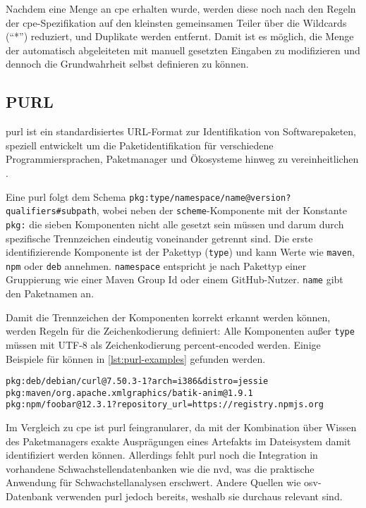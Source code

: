 Nachdem eine Menge an \acrshort{cpe} erhalten wurde, werden diese noch nach den Regeln der \acrshort{cpe}-Spezifikation auf den kleinsten gemeinsamen Teiler über die Wildcards (\enquote{*}) reduziert, und Duplikate werden entfernt.
Damit ist es möglich, die Menge der automatisch abgeleiteten  mit manuell gesetzten Eingaben zu modifizieren und dennoch die Grundwahrheit selbst definieren zu können.

\subsection{PURL}

\acrshort{purl} ist ein standardisiertes URL-Format zur Identifikation von Softwarepaketen, speziell entwickelt um die Paketidentifikation für verschiedene Programmiersprachen, Paketmanager und Ökosysteme hinweg zu vereinheitlichen \autocite{PackageURLSpec}.

Eine \acrshort{purl} folgt dem Schema \texttt{pkg:type/namespace/name@version?qualifiers\#subpath}, wobei neben der \texttt{scheme}-Komponente mit der Konstante \texttt{pkg:} die sieben Komponenten nicht alle gesetzt sein müssen und darum durch spezifische Trennzeichen eindeutig voneinander getrennt sind.
Die erste identifizierende Komponente ist der Pakettyp (\texttt{type}) und kann Werte wie \texttt{maven}, \texttt{npm} oder \texttt{deb} annehmen.
\texttt{namespace} entspricht je nach Pakettyp einer Gruppierung wie einer Maven Group Id oder einem GitHub-Nutzer.
\texttt{name} gibt den Paketnamen an.

Damit die Trennzeichen der Komponenten korrekt erkannt werden können, werden Regeln für die Zeichenkodierung definiert: Alle Komponenten außer \texttt{type} müssen mit UTF-8 als Zeichenkodierung percent-encoded werden.
Einige Beispiele für  können in \autoref{lst:purl-examples} gefunden werden.

\begin{lstlisting}[caption=Beispielhafte PURLs verschiedener Pakettypen,label=lst:purl-examples]
pkg:deb/debian/curl@7.50.3-1?arch=i386&distro=jessie
pkg:maven/org.apache.xmlgraphics/batik-anim@1.9.1
pkg:npm/foobar@12.3.1?repository_url=https://registry.npmjs.org
\end{lstlisting}

Im Vergleich zu \acrshort{cpe} ist \acrshort{purl} feingranularer, da mit der Kombination über Wissen des Paketmanagers exakte Ausprägungen eines Artefakts im Dateisystem damit identifiziert werden können.
Allerdings fehlt \acrshort{purl} noch die Integration in vorhandene Schwachstellendatenbanken wie die \acrshort{nvd}, was die praktische Anwendung für Schwachstellanalysen erschwert.
Andere Quellen wie \acrshort{osv}-Datenbank verwenden \acrshort{purl} jedoch bereits, weshalb sie durchaus relevant sind.

